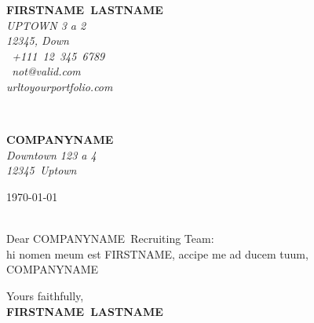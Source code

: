 \documentclass[11pt]{article}
\makeatletter
\newcommand{\firstName}{FIRSTNAME}
\newcommand{\lastName}{LASTNAME}
\newcommand{\address}{UPTOWN 3 a 2}
\newcommand{\postcodeAndCity}{12345, Down}
\newcommand{\phonenumber}{+111~12~345~6789}
\newcommand{\email}{not@valid.com}
\newcommand{\portfolio}{urltoyourportfolio.com}
\newcommand{\companyName}{COMPANYNAME}
\newcommand{\companyAdress}{Downtown 123 a 4}
\newcommand{\companyPostcode}{12345}
\newcommand{\companyCity}{Uptown}
\makeatother
\begin{document}
\sffamily   %
\hfill%
\begin{minipage}[t]{.6\textwidth}
\raggedleft%
{\bfseries \firstName~\lastName}\\[.35ex]
\small\itshape%
\address\\
\postcodeAndCity\\[.35ex]
\Telefon~\phonenumber\\
\Letter~{\email}\\ %
\portfolio
\end{minipage}\\[1em]
%
\begin{minipage}[t]{.4\textwidth}
\raggedright%
{\bfseries \companyName}\\[.35ex]
\small\itshape%
\companyAdress\\
\companyPostcode~\companyCity
\end{minipage}
\hfill %
\begin{minipage}[t]{.4\textwidth}
\raggedleft %
\today
\end{minipage}\\[2em]
Dear \companyName~Recruiting Team:\\[1em]
%

hi nomen meum est \firstName, accipe me ad ducem tuum, \companyName~ 
\lipsum[1-3]




\vfill{}
Yours faithfully,\\[1em]
%
{\bfseries \firstName~\lastName}\\
%
\vfill%


\end{document}
